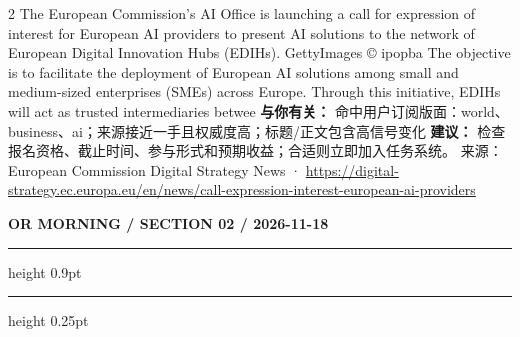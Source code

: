 \documentclass[10.5pt]{ctexart}
\begin{document}
\begin{multicols}{2}
The European Commission’s AI Office is launching a call for expression of interest for European AI providers to present AI solutions to the network of European Digital Innovation Hubs (EDIHs). GettyImages © ipopba The objective is to facilitate the deployment of European AI solutions among small and medium-sized enterprises (SMEs) across Europe. Through this initiative, EDIHs will act as trusted intermediaries betwee
\textbf{与你有关：} 命中用户订阅版面：world、business、ai；来源接近一手且权威度高；标题/正文包含高信号变化
\textbf{建议：} 检查报名资格、截止时间、参与形式和预期收益；合适则立即加入任务系统。
{\footnotesize\color{ormuted} 来源：European Commission Digital Strategy News · \url{https://digital-strategy.ec.europa.eu/en/news/call-expression-interest-european-ai-providers}}
\end{multicols}
\newpage
{\small\bfseries OR MORNING / SECTION 02 / 2026-11-18}
\vspace{2mm}
\hrule height 0.9pt
\vspace{1.5mm}
\hrule height 0.25pt
\vspace{4mm}
\end{document}
